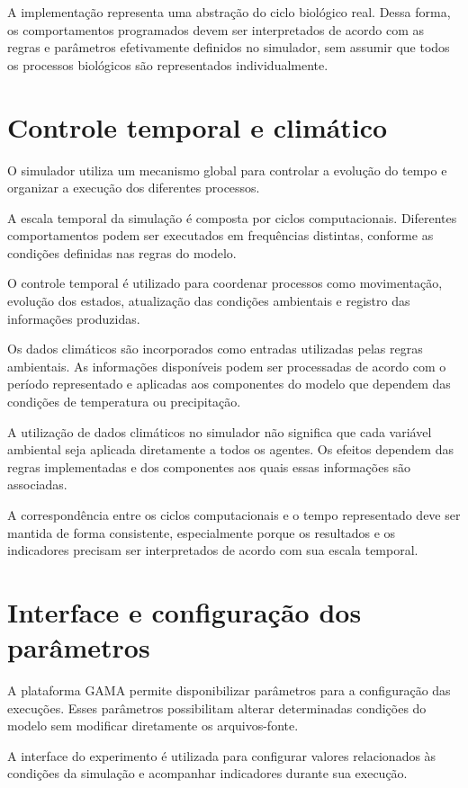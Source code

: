 A implementação representa uma abstração do ciclo biológico real. Dessa forma, os comportamentos programados devem ser interpretados de acordo com as regras e parâmetros efetivamente definidos no simulador, sem assumir que todos os processos biológicos são representados individualmente.

\section{Controle temporal e climático}

O simulador utiliza um mecanismo global para controlar a evolução do tempo e organizar a execução dos diferentes processos.

A escala temporal da simulação é composta por ciclos computacionais. Diferentes comportamentos podem ser executados em frequências distintas, conforme as condições definidas nas regras do modelo.

O controle temporal é utilizado para coordenar processos como movimentação, evolução dos estados, atualização das condições ambientais e registro das informações produzidas.

Os dados climáticos são incorporados como entradas utilizadas pelas regras ambientais. As informações disponíveis podem ser processadas de acordo com o período representado e aplicadas aos componentes do modelo que dependem das condições de temperatura ou precipitação.

A utilização de dados climáticos no simulador não significa que cada variável ambiental seja aplicada diretamente a todos os agentes. Os efeitos dependem das regras implementadas e dos componentes aos quais essas informações são associadas.

A correspondência entre os ciclos computacionais e o tempo representado deve ser mantida de forma consistente, especialmente porque os resultados e os indicadores precisam ser interpretados de acordo com sua escala temporal.

\section{Interface e configuração dos parâmetros}

A plataforma GAMA permite disponibilizar parâmetros para a configuração das execuções. Esses parâmetros possibilitam alterar determinadas condições do modelo sem modificar diretamente os arquivos-fonte.

A interface do experimento é utilizada para configurar valores relacionados às condições da simulação e acompanhar indicadores durante sua execução.

